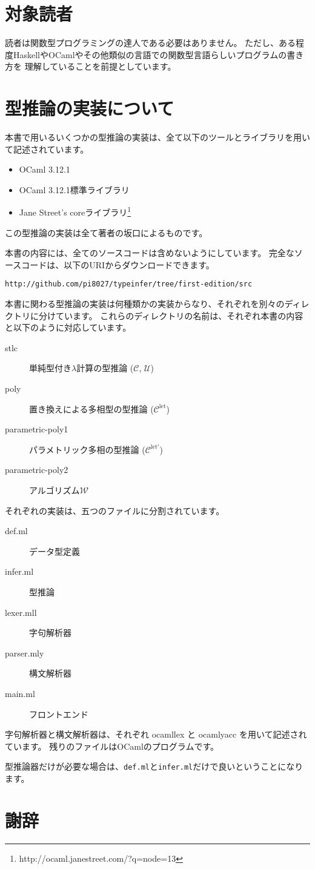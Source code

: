 \section*{対象読者}

読者は関数型プログラミングの達人である必要はありません。
ただし、ある程度HaskellやOCamlやその他類似の言語での関数型言語らしいプログラムの書き方を
理解していることを前提としています。

\section*{型推論の実装について}

本書で用いるいくつかの型推論の実装は、全て以下のツールとライブラリを用いて記述されています。

\begin{itemize}
 \item OCaml 3.12.1
 \item OCaml 3.12.1標準ライブラリ
 \item Jane Street's coreライブラリ\footnote{http://ocaml.janestreet.com/?q=node=13}
\end{itemize}

この型推論の実装は全て著者の坂口によるものです。

本書の内容には、全てのソースコードは含めないようにしています。
完全なソースコードは、以下のURIからダウンロードできます。

\texttt{http://github.com/pi8027/typeinfer/tree/first-edition/src}

本書に関わる型推論の実装は何種類かの実装からなり、それぞれを別々のディレクトリに分けています。
これらのディレクトリの名前は、それぞれ本書の内容と以下のように対応しています。

\begin{description}
  \item[stlc] 単純型付き$\lambda$計算の型推論 ($\mathcal C$, $\mathcal U$)
  \item[poly] 置き換えによる多相型の型推論 ($\mathcal C^\mathrm{let}$)
  \item[parametric-poly1] パラメトリック多相の型推論 ($\mathcal C^\mathrm{let'}$)
  \item[parametric-poly2] アルゴリズム$\mathcal W$
\end{description}

それぞれの実装は、五つのファイルに分割されています。

\begin{description}
  \item[def.ml] データ型定義
  \item[infer.ml] 型推論
  \item[lexer.mll] 字句解析器
  \item[parser.mly] 構文解析器
  \item[main.ml] フロントエンド
\end{description}

字句解析器と構文解析器は、それぞれ ocamllex と ocamlyacc を用いて記述されています。
残りのファイルはOCamlのプログラムです。

型推論器だけが必要な場合は、\texttt{def.ml}と\texttt{infer.ml}だけで良いということになります。

\section*{謝辞}



